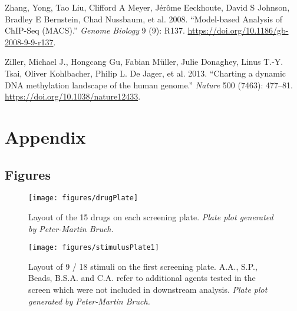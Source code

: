 \documentclass[11pt, a4paper, twosided]{book}
\newenvironment{CSLReferences}%
  {}%
  {\par}
\begin{document}
\begin{CSLReferences}{1}{0}
\leavevmode{}%
Zhang, Yong, Tao Liu, Clifford A Meyer, Jérôme Eeckhoute, David S Johnson, Bradley E Bernstein, Chad Nussbaum, et al. 2008. {``{Model-based Analysis of ChIP-Seq (MACS)}.''} \emph{Genome Biology} 9 (9): R137. \url{https://doi.org/10.1186/gb-2008-9-9-r137}.

\leavevmode{}%
Ziller, Michael J., Hongcang Gu, Fabian Müller, Julie Donaghey, Linus T.-Y. Tsai, Oliver Kohlbacher, Philip L. De Jager, et al. 2013. {``{Charting a dynamic DNA methylation landscape of the human genome}.''} \emph{Nature} 500 (7463): 477--81. \url{https://doi.org/10.1038/nature12433}.

\end{CSLReferences}
\indent
\setlength{\parindent}{17pt}
\setlength{\leftskip}{0pt}
\setlength{\parskip}{0pt}

\newpage

\hypertarget{appendix}{%
\chapter*{Appendix}\label{appendix}}

\hypertarget{figures}{%
\section*{Figures}\label{figures}}


\begin{figure}

{\centering \texttt{[image: figures/drugPlate]} 

}

\caption{Layout of the 15 drugs on each screening plate. \emph{Plate plot generated by Peter-Martin Bruch.}}\label{fig:drugPlot}
\end{figure}

\begin{figure}

{\centering \texttt{[image: figures/stimulusPlate1]} 

}

\caption{Layout of 9 / 18 stimuli on the first screening plate. A.A., S.P., Beads, B.S.A. and C.A. refer to additional agents tested in the screen which were not included in downstream analysis. \emph{Plate plot generated by Peter-Martin Bruch.}}\label{fig:stimulusPlot1}
\end{figure}
\end{document}
